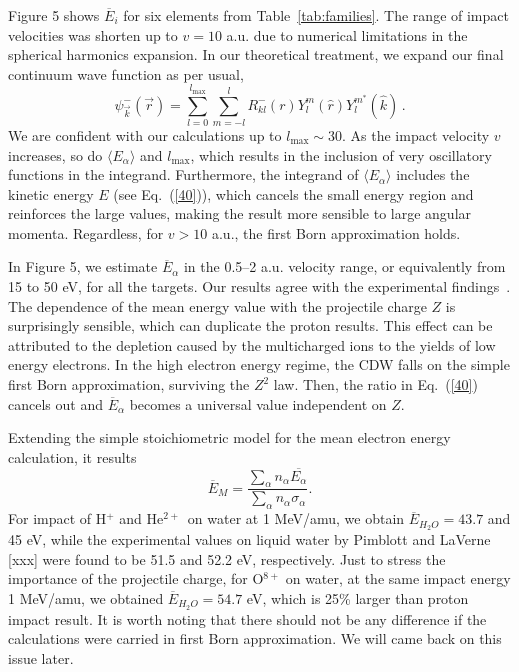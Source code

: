 \documentclass[preprint,12pt]{article}
\begin{document}
Figure 5 shows $\overline{E}_{i}$ for six elements from 
Table~\ref{tab:families}. The range of impact velocities was shorten up 
to $v=10$ a.u. due to numerical limitations in the spherical harmonics 
expansion. In our theoretical treatment, we expand our final continuum 
wave function as per usual,
\begin{equation}
\psi_{\overrightarrow{k}}^{-}(\overrightarrow{r})=\sum_{l=0}^{l_{\max
}}\sum_{m=-l}^{l}R_{kl}^{-}(r)Y_{l}^{m}(\widehat{r})Y_{l}^{m^{\ast }}
(\widehat{k})\,.
\label{60}
\end{equation}
We are confident with our calculations up to $l_{\max}\sim 30$. 
As the impact velocity $v$ increases, so do $\langle E_{\alpha}\rangle$
and $l_{\max}$, which results in the inclusion of very oscillatory 
functions in the integrand. Furthermore, the integrand of
$\langle E_{\alpha}\rangle$ includes the kinetic energy $E$
(see Eq.~(\ref{40})), which cancels the small energy region and 
reinforces the large values, making the result more sensible to large
angular momenta. Regardless, for $v>10$ a.u., the first Born 
approximation holds.

In Figure 5, we estimate $\overline{E}_{\alpha}$ in the 0.5--2 a.u.
velocity range, or equivalently from 15 to 50 eV, for all the targets.
Our results agree with the experimental findings~\cite{surdutovic2018}. 
The dependence of the mean energy value with the projectile charge $Z$ 
is surprisingly sensible, which can duplicate the proton results. 
This effect can be attributed to the depletion caused by the 
multicharged ions to the yields of low energy electrons. In the high 
electron energy regime, the CDW falls on the simple first Born 
approximation, surviving the $Z^{2}$ law. Then, the ratio in 
Eq.~(\ref{40}) cancels out and $\overline{E}_{\alpha}$ becomes a 
universal value independent on $Z$.

Extending the simple stoichiometric model for the mean electron energy
calculation, it results
\begin{equation}
\overline{E}_{M}=\frac{\sum\limits_{\alpha}n_{\alpha}
\overline{E_{\alpha}}}{\sum\limits_{\alpha}n_{\alpha}\sigma_{\alpha}}.
\label{70}
\end{equation}
For impact of H$^{+}$ and He$^{2+~}$ on water at 1 MeV/amu, we obtain 
$\overline{E}_{H_{2}O}=43.7$ and 45 eV, while the experimental values 
on liquid water by Pimblott and LaVerne [xxx] were found to be 51.5 and 
52.2 eV, respectively. Just to stress the importance of the projectile 
charge, for O$^{8+}$ on water, at the same impact energy 1 MeV/amu, 
we obtained $\overline{E}_{H_{2}O}=54.7$ eV, which is 25\% larger than 
proton impact result. It is worth noting that there should not be any 
difference if the calculations were carried in first Born approximation. 
We will came back on this issue later.
\end{document}
